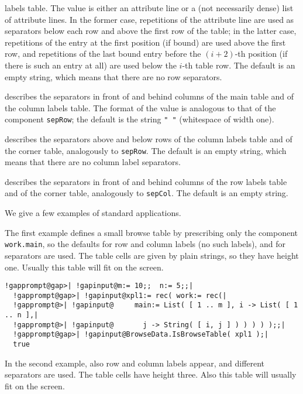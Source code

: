 \documentclass[a4paper,11pt]{report}
\begin{document}
{{{\begin{description}
labels table. The value is either an attribute line or a (not necessarily
dense) list of attribute lines. In the former case, repetitions of the
attribute line are used as separators below each row and above the first row
of the table; in the latter case, repetitions of the entry at the first
position (if bound) are used above the first row, and repetitions of the last
bound entry before the $(i+2)$-th position (if there is such an entry at all) are used below the $i$-th table row. The default is an empty string, which means that there are no
row separators. 
\item[{\texttt{sepCol}}]  describes the separators in front of and behind columns of the main table and
of the column labels table. The format of the value is analogous to that of
the component \texttt{sepRow}; the default is the string \texttt{" "} (whitespace of width one). 
\item[{\texttt{sepLabelsCol}}]  describes the separators above and below rows of the column labels table and
of the corner table, analogously to \texttt{sepRow}. The default is an empty string, which means that there are no column label
separators. 
\item[{\texttt{sepLabelsRow}}]  describes the separators in front of and behind columns of the row labels
table and of the corner table, analogously to \texttt{sepCol}. The default is an empty string. 
\end{description}
 We give a few examples of standard applications. 

 The first example defines a small browse table by prescribing only the
component \texttt{work.main}, so the defaults for row and column labels (no such labels), and for
separators are used. The table cells are given by plain strings, so they have
height one. Usually this table will fit on the screen. 

 
\begin{Verbatim}[commandchars=!@|,fontsize=\small,frame=single,label=Example]
  !gapprompt@gap>| !gapinput@m:= 10;;  n:= 5;;|
  !gapprompt@gap>| !gapinput@xpl1:= rec( work:= rec(|
  !gapprompt@>| !gapinput@     main:= List( [ 1 .. m ], i -> List( [ 1 .. n ],|
  !gapprompt@>| !gapinput@       j -> String( [ i, j ] ) ) ) ) );;|
  !gapprompt@gap>| !gapinput@BrowseData.IsBrowseTable( xpl1 );|
  true
\end{Verbatim}
 

 In the second example, also row and column labels appear, and different
separators are used. The table cells have height three. Also this table will
usually fit on the screen. 

}}}
\end{document}
